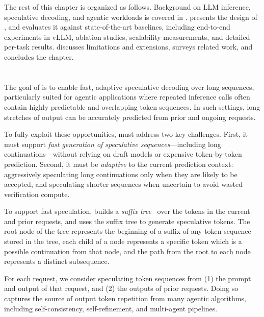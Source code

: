 The rest of this chapter is organized as follows. Background on LLM inference, speculative decoding, and agentic workloads is covered in .  presents the design of \SuffixDecoding, and  evaluates it against state-of-the-art baselines, including end-to-end experiments in vLLM, ablation studies, scalability measurements, and detailed per-task results.  discusses limitations and extensions,  surveys related work, and  concludes the chapter.

\section{\SuffixDecoding}
\label{suffixdecoding:sec:method}

The goal of \SuffixDecoding is to enable fast, adaptive speculative decoding over long sequences, particularly suited for agentic applications where repeated inference calls often contain highly predictable and overlapping token sequences. In such settings, long stretches of output can be accurately predicted from prior and ongoing requests.

To fully exploit these opportunities, \SuffixDecoding must address two key challenges. First, it must support \emph{fast generation of speculative sequences}---including long continuations---without relying on draft models or expensive token-by-token prediction. Second, it must be \emph{adaptive} to the current prediction context: aggressively speculating long continuations only when they are likely to be accepted, and speculating shorter sequences when uncertain to avoid wasted verification compute.

To support fast speculation, \SuffixDecoding builds a \emph{suffix tree}~\citep{10.1109/SWAT.1973.13} over the tokens in the current and prior requests, and uses the suffix tree to generate speculative tokens.
The root node of the tree represents the beginning of a suffix of any token sequence stored in the tree, each child of a node represents a specific token which is a possible continuation from that node, and the path from the root to each node represents a distinct subsequence.

For each request, we consider speculating token sequences from (1) the prompt and output of that request, and (2) the outputs of prior requests. Doing so captures the source of output token repetition from many agentic algorithms, including self-consistency, self-refinement, and multi-agent pipelines.

